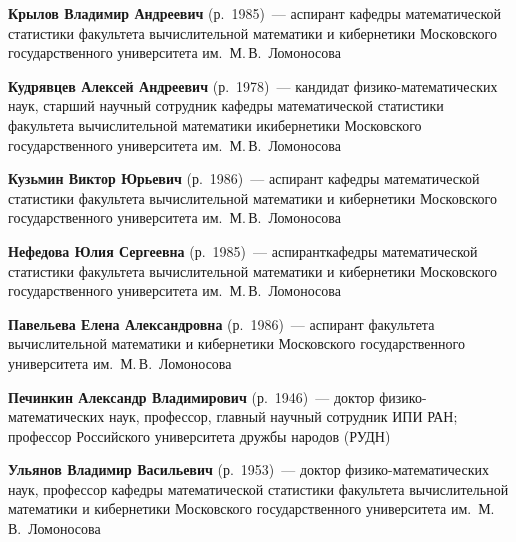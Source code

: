 \begin{multicols}{2}
\vspace*{3pt}

\noindent
\textbf{Крылов Владимир Андреевич} (р.\ 1985)~--- аспирант
кафедры математической статистики факультета вычислительной математики и кибернетики 
Московского государственного университета им.~М.\,В.~Ломоносова

\vspace*{3pt}

\noindent
\textbf{Кудрявцев Алексей Андреевич} (р.\ 1978)~--- 
кан\-дидат физико-математических наук, старший научный 
сотрудник кафедры математической статистики факультета 
вычислительной математики и\linebreak кибернетики Московского 
государственного университета им.\ М.\,В.~Ломоносова 

\vspace*{3pt}

\noindent 
\textbf{Кузьмин Виктор Юрьевич} (р.\ 1986)~--- аспирант
кафедры математической статистики факультета вычислительной математики и кибернетики 
Московского государственного университета им.~М.\,В.~Ломоносова

\vspace*{3pt}

\noindent
\textbf{Нефедова Юлия Сергеевна}  (р.\ 1985)~--- аспирант\linebreak кафедры 
математической статистики факультета вычислительной 
математики и кибернетики Московского государственного университета 
им.\ М.\,В.~Ломоносова

\vspace*{3pt}

\noindent
\textbf{Павельева Елена Александровна} (р.\ 1986)~--- 
аспирант факультета вычислительной математики и кибернетики 
Московского государственного университета им.\ М.\,В.~Ломоносова

\vspace*{3pt}

\noindent
\textbf{Печинкин Александр Владимирович} (р.\ 1946)~--- доктор
физико-математических наук, профессор, главный научный сотрудник
ИПИ РАН; профессор Российского университета дружбы народов (РУДН)


\vspace*{3pt}
\noindent
\textbf{Ульянов Владимир Васильевич} (р.\ 1953)~---  
доктор фи\-зи\-ко-ма\-те\-ма\-ти\-че\-ских наук, профессор 
кафедры математической статистики факультета вычислительной 
математики и кибернетики Московского государственного 
университета им.\ М.\,В.~Ломоносова


\end{multicols}
